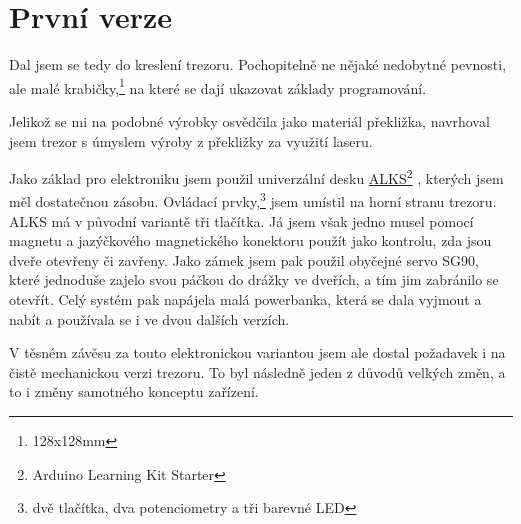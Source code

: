 \section{První verze}
\label{E1-vyvoj}

Dal jsem se tedy do kreslení trezoru. Pochopitelně ne nějaké nedobytné pevnosti, ale malé
krabičky,\footnote{128x128mm} na které se dají ukazovat základy programování. 

Jelikož se mi na podobné výrobky osvědčila jako materiál překližka, navrhoval jsem trezor s úmyslem výroby z překližky za využití laseru. 

Jako základ pro elektroniku  jsem použil univerzální 
desku \href{https://github.com/RoboticsBrno/ArduinoLearningKitStarter}{ALKS}\footnote{Arduino Learning Kit Starter} \parencite{ALKS}, 
kterých jsem měl dostatečnou zásobu. Ovládací prvky,\footnote{dvě tlačítka, dva potenciometry a tři barevné LED} jsem umístil na horní stranu trezoru. 
ALKS má v původní variantě tři tlačítka. Já jsem však jedno musel pomocí magnetu a jazýčkového magnetického konektoru použít
jako kontrolu, zda jsou dveře otevřeny či zavřeny. %
Jako zámek jsem pak použil obyčejné servo
SG90, které jednoduše zajelo svou páčkou do drážky ve dveřích, a tím jim zabránilo 
se otevřít. Celý systém pak napájela malá powerbanka, která se dala vyjmout a nabít  
a používala se i ve dvou dalších verzích.


V těsném závěsu za touto elektronickou variantou jsem ale dostal poža\-da\-vek i na čistě mechanickou verzi trezoru. 
To byl následně jeden z důvodů velkých změn, a to i změny samotného konceptu zařízení.